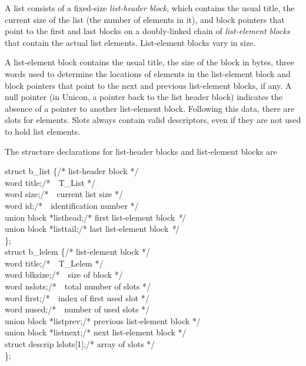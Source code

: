 A list consists of a fixed-size \textit{list-header block}, which
contains the usual title, the current size of the list (the number of
elements in it), and block pointers that point to the first and last
blocks on a doubly-linked chain of \textit{list-element blocks} that
contain the actual list elements. List-element blocks vary in size.


A list-element block contains the usual title, the size of the block
in bytes, three words used to determine the locations of elements in
the list-element block and block pointers that point to the next and
previous list-element blocks, if any. A null pointer
\textcolor[rgb]{0.0,0.2784314,1.0}{(in Unicon, a pointer back to the
list header block)} indicates the absence of a pointer to another
list-element block. Following this data, there are slots for
elements. Slots always contain valid descriptors, even if they are not
used to hold list elements.


The structure declarations for list-header blocks and list-element blocks are

\begin{iconcode}
\>struct b\_list \{\>\>\>\>\>\>\>/* list-header block */\\
\>\>word title;\>\>\>\>\>\>\>/*\ \ T\_List */\\
\>\>word size;\>\>\>\>\>\>\>/*\ \ current list size */\\
\>\>word id;\>\>\>\>\>\>\>/*\ \ identification number */\\
\>\>union block *listhead;\>\>\>\>\>\>\>/* first list-element block \textit{*}/\\
\>\>union block *listtail;\>\>\>\>\>\>\>/* last list-element block \textit{*}/\\
\>\};\\
\>struct b\_lelem \{\>\>\>\>\>\>\>/* list-element block */\\
\>\>word title;\>\>\>\>\>\>\>/*\ \ T\_Lelem */\\
\>\>word blksize;\>\>\>\>\>\>\>/*\ \ size of block */\\
\>\>word nslots;\>\>\>\>\>\>\>/*\ \ total number of slots */\\
\>\>word first;\>\>\>\>\>\>\>/*\ \ index of first used slot */\\
\>\>word nused;\>\>\>\>\>\>\>/*\ \ number of used slots */\\
\>\>union block *listprev;\>\>\>\>\>\>\>/* previous list-element block */\\
\>\>union block *listnext;\>\>\>\>\>\>\>/* next list-element block */\\
\>\>struct descrip lslots[1];\>\>\>\>\>\>\>/* array of slots */\\
\>\};
\end{iconcode}

